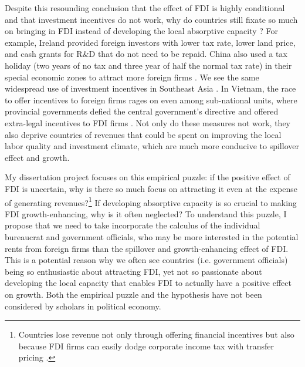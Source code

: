 \documentclass[12pt]{article}
\begin{document}
Despite this resounding conclusion that the effect of FDI is highly conditional and that investment incentives do not work, why do countries still fixate so much on bringing in FDI instead of developing the local absorptive capacity \citep{Blomstrom2002}? For example, Ireland provided foreign investors with lower tax rate, lower land price, and cash grants for R\&D that do not need to be repaid. China also used a tax holiday (two years of no tax and three year of half the normal tax rate) in their special economic zones to attract more foreign firms \citep{Telford2001}. We see the same widespread use of investment incentives in Southeast Asia \citep{Fletcher2002}. In Vietnam, the race to offer incentives to foreign firms rages on even among sub-national units, where provincial governments defied the central government's directive and offered extra-legal incentives to FDI firms \citep{Vu2007}. Not only do these measures not work, they also deprive countries of revenues that could be spent on improving the local labor quality and investment climate, which are much more conducive to spillover effect and growth.

My dissertation project focuses on this empirical puzzle: if the positive effect of FDI is uncertain, why is there so much focus on attracting it even at the expense of generating revenues?\footnote{Countries lose revenue not only through offering financial incentives but also because FDI firms can easily dodge corporate income tax with transfer pricing \citep{Bartelsman2003}.} If developing absorptive capacity is so crucial to making FDI growth-enhancing, why is it often neglected? To understand this puzzle, I propose that we need to take incorporate the calculus of the individual bureaucrat and government officials, who may be more interested in the potential rents from foreign firms than the spillover and growth-enhancing effect of FDI. This is a potential reason why we often see countries (i.e. government officials) being so enthusiastic about attracting FDI, yet not so passionate about developing the local capacity that enables FDI to actually have a positive effect on growth. Both the empirical puzzle and the hypothesis have not been considered by scholars in political economy.
\end{document}
